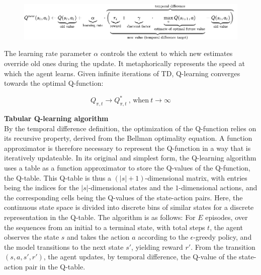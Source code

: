 \begin{figure}[h]
\includegraphics[width=\textwidth]{img/I/Selection_096.png}
\centering
\end{figure}

The learning rate parameter $\alpha$ controls the extent to which new estimates override old ones during the update. It metaphorically represents the speed at which the agent learns. Given infinite iterations of TD, Q-learning converges towards the optimal Q-function:

\[ Q_{\pi,t} \longrightarrow Q_{\pi,t}^*\ \text{, when}\ t \longrightarrow \infty \]

\textbf{Tabular Q-learning algorithm} \\
By the temporal difference definition, the optimization of the Q-function relies on its recursive property, derived from the Bellman optimality equation. A function approximator is therefore necessary to represent the Q-function in a way that is iteratively updateable.
In its original and simplest form, the Q-learning algorithm uses a table as a function approximator to store the Q-values of the Q-function, the Q-table. This Q-table is thus a $(|s|+1)$-dimensional matrix, with entries being the indices for the $|s|$-dimensional states and the $1$-dimensional actions, and the corresponding cells being the Q-values of the state-action pairs. Here, the continuous state space is divided into discrete bins of similar states for a discrete representation in the Q-table. The algorithm is as follows: 
For $E$ episodes, over the sequences from an initial to a terminal state, with total steps $t$, the agent observes the state $s$ and takes the action $a$ according to the $\epsilon$-greedy policy, and the model transitions to the next state $s'$, yielding reward $r'$. From the transition $(s,a,s',r')$, the agent updates, by temporal difference, the Q-value of the state-action pair in the Q-table.

